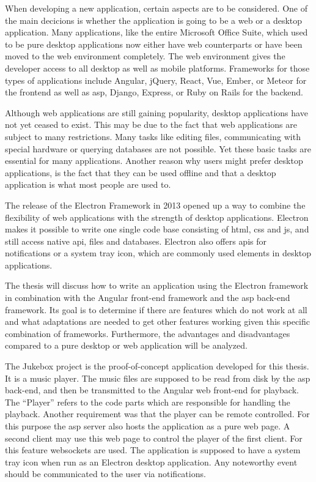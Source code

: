 
When developing a new application, certain aspects are to be considered. One of the main decicions is whether the application is going to be a web or a desktop application. Many applications, like the entire Microsoft Office Suite, which used to be pure desktop applications now either have web counterparts or have been moved to the web environment completely. The web environment gives the developer access to all desktop as well as mobile platforms. Frameworks for those types of applications include Angular, jQuery, React, Vue, Ember, or Meteor for the frontend as well as \gls{asp}, Django, Express, or Ruby on Rails for the backend.

Although web applications are still gaining popularity, desktop applications have not yet ceased to exist. This may be due to the fact that web applications are subject to many restrictions. Many tasks like editing files, communicating with special hardware or querying databases are not possible. Yet these basic tasks are essential for many applications. Another reason why users might prefer desktop applications, is the fact that they can be used offline and that a desktop application is what most people are used to.

The release of the Electron Framework in 2013 opened up a way to combine the flexibility of web applications with the strength of desktop applications. Electron makes it possible to write one single code base consisting of \gls{html}, \gls{css} and \gls{js}, and still access native \gls{api}, files and databases. Electron also offers \gls{api}s for notifications or a system tray icon, which are commonly used elements in desktop applications.

The thesis will discuss how to write an application using the Electron framework in combination with the Angular front-end framework and the \gls{asp} back-end framework. Its goal is to determine if there are features which do not work at all and what adaptations are needed to get other features working given this specific combination of frameworks. Furthermore, the advantages and disadvantages compared to a pure desktop or web application will be analyzed.


The Jukebox project is the proof-of-concept application developed for this thesis. It is a music player. The music files are supposed to be read from disk by the \gls{asp} back-end, and then be transmitted to the Angular web front-end for playback. The \enquote{Player} refers to the code parts which are responsible for handling the playback. Another requirement was that the player can be remote controlled. For this purpose the \gls{asp} server also hosts the application as a pure web page. A second client may use this web page to control the player of the first client. For this feature websockets are used. The application is supposed to have a system tray icon when run as an Electron desktop application. Any noteworthy event should be communicated to the user via notifications.

